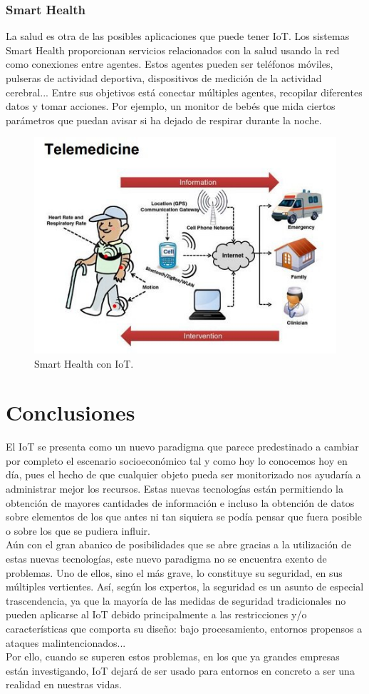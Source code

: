\documentclass[12pt, twoside]{book}
\begin{document}
\subsubsection*{Smart Health}
La salud es otra de las posibles aplicaciones que puede tener IoT. Los sistemas Smart Health proporcionan servicios relacionados con la salud usando la red como conexiones entre agentes. Estos agentes pueden ser teléfonos móviles, pulseras de actividad deportiva, dispositivos de medición de la actividad cerebral... Entre sus objetivos está conectar múltiples agentes, recopilar diferentes datos y tomar acciones. Por ejemplo, un monitor de bebés que mida ciertos parámetros que puedan avisar si ha dejado de respirar durante la noche. 
\begin{figure}[H]
\centering
\includegraphics[scale=0.4]{images/smart_health}
\caption{Smart Health con IoT.}\label{smart_health}
\end{figure}
\section{Conclusiones}
El IoT se presenta como un nuevo paradigma que parece predestinado a cambiar por completo el escenario socioeconómico tal y como hoy lo conocemos hoy en día, pues el hecho de que cualquier objeto pueda ser monitorizado nos ayudaría a administrar mejor los recursos. Estas nuevas tecnologías están permitiendo la obtención de mayores cantidades de información e incluso la obtención de datos sobre elementos de los que antes ni tan siquiera se podía pensar que fuera posible o sobre los que se pudiera influir.\\
Aún con el gran abanico de posibilidades que se abre gracias a la utilización de estas nuevas tecnologías, este nuevo paradigma no se encuentra exento de problemas. Uno de ellos, sino el más
grave, lo constituye su seguridad, en sus múltiples vertientes. Así, según los expertos, la seguridad es un asunto de especial trascendencia, ya que la mayoría de las medidas de seguridad tradicionales no pueden aplicarse al IoT debido principalmente a las restricciones y/o características que comporta su diseño: bajo procesamiento, entornos propensos a ataques malintencionados...\\
Por ello, cuando se superen estos problemas, en los que ya grandes empresas están investigando, IoT dejará de ser usado para entornos en concreto a ser una realidad en nuestras vidas.
\end{document}
